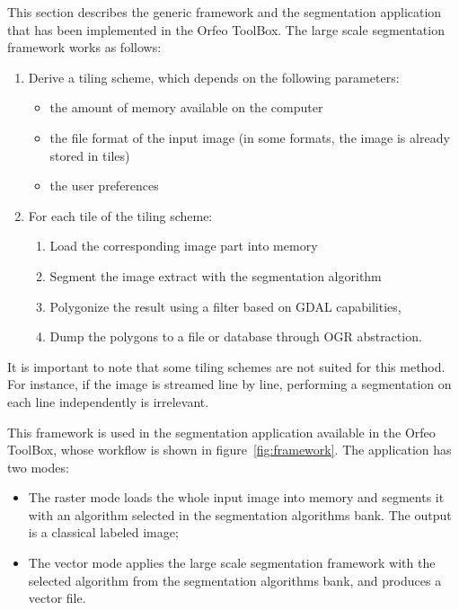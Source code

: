 \documentclass{josis}
\begin{document}
This section describes the generic framework and the segmentation
application that has been implemented in the Orfeo ToolBox. The large
scale segmentation framework works as follows:
\begin{enumerate}[1 - ]
\item Derive a tiling scheme, which depends on the following
  parameters:
\begin{itemize}
\item the amount of memory available on the computer
\item the file format of the input image (in some formats,
the image is already stored in tiles)
\item the user preferences
\end{itemize}
\item For each tile of the tiling scheme:
\begin{enumerate}[a - ]
\item Load the corresponding image part into memory
\item Segment the image extract with the segmentation algorithm
\item Polygonize the result using a filter based on GDAL capabilities,
\item Dump the polygons to a file or database through OGR
      abstraction.
\end{enumerate}
\end{enumerate}

It is important to note that some tiling schemes are not suited for
this method. For instance, if the image is streamed line by line,
performing a segmentation on each line independently is irrelevant.

This framework is used in the segmentation application available in
the Orfeo ToolBox, whose workflow is shown in
figure~\ref{fig:framework}. The application has two modes:
\begin{itemize}
\item The raster
mode loads the whole input image into memory and segments it with an
algorithm selected in the segmentation algorithms bank. The output is a
classical labeled image; 
\item The vector mode applies the large
scale segmentation framework with the selected algorithm from the
segmentation algorithms bank, and produces a vector file.
\end{itemize}
\end{document}
